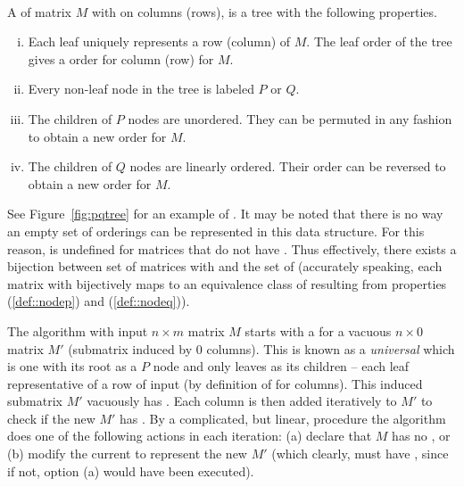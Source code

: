 \begin{definition}\\
  A \PQtree of matrix $M$ with \COP on columns (rows), is a tree with the following properties.
  \begin{enumerate}[i.]
    \singlespacing
  \item Each leaf uniquely represents a row (column) of $M$. The leaf
    order of the tree gives a \COP order for column (row) for $M$.
  \item Every non-leaf node in the tree is labeled $P$ or $Q$.
  \item \label{def::nodep} The children of $P$ nodes are
    unordered. They can be permuted in any fashion to obtain a new
    \COP order for $M$.
  \item \label{def::nodeq} The children of $Q$ nodes are linearly
    ordered. Their order can be reversed to obtain a new \COP
    order for $M$.
  \end{enumerate}
  \label{def:pqtree}
\end{definition}

See Figure~\ref{fig:pqtree} for an example of \PQtree. It may be noted
that there is no way an empty set of \COP orderings can be represented
in this data structure. For this reason, \PQtree is undefined for
matrices that do not have \COP.  Thus effectively, there exists a
bijection between set of matrices with \COP and the set of \PQtrees
(accurately speaking, each matrix with \COP bijectively maps to an
equivalence class of \PQtrees resulting from properties (\ref{def::nodep}) and
(\ref{def::nodeq})).


\figpqtree

The \cite{bl76} algorithm with input $n \times m$ matrix $M$ starts
with a \PQtree for a vacuous $n \times 0$ matrix $M'$ (submatrix
induced by 0 columns). This is known as a {\em universal} \PQtree
which is one with its root as a $P$ node and only leaves as its
children -- each leaf representative of a row of input (by definition
of \COP for columns). This induced submatrix $M'$ vacuously has \COP.
Each column is then added iteratively to $M'$ to check if the new $M'$
has \COP.  By a complicated, but linear, procedure the algorithm does
one of the following actions in each iteration: (a) declare that $M$
has no \COP, or (b) modify the current \PQtree to represent the new
$M'$ (which clearly, must have \COP, since if not, option (a) would
have been executed).


